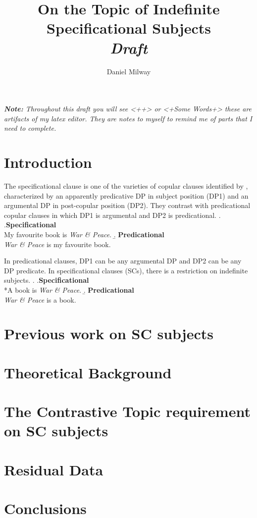 \documentclass[letterpaper]{article}
\title{On the Topic of Indefinite Specificational Subjects\\\textit{Draft}}
\author{Daniel Milway}
\begin{document}
\maketitle
\doublespacing
\textit{\textbf{Note:} Throughout this draft you will see <++> or <+Some Words+> these are artifacts of my latex editor.
They are notes to myself to remind me of parts that I need to complete.
}
\section{Introduction}
The specificational clause is one of the varieties of copular clauses identified by \textcite{higgins1973pseudo}, characterized by an apparently predicative DP in subject position (DP1) and an argumental DP in post-copular position (DP2).
They contrast with predicational copular clauses in which DP1 is argumental and DP2 is predicational.
\ex.
\a.\textbf{Specificational}\\
My favourite book is \textit{War \& Peace}.
\b. \textbf{Predicational}\\
\textit{War \& Peace} is my favourite book.

In predicational clauses, DP1 can be any argumental DP and DP2 can be any DP predicate.
In specificational clauses (SCs), there is a restriction on indefinite subjects.
\ex.
\a.\textbf{Specificational}\\
*A book is \textit{War \& Peace}.
\b. \textbf{Predicational}\\
\textit{War \& Peace} is a book.


\section{Previous work on SC subjects}

\section{Theoretical Background}

\section{The Contrastive Topic requirement on SC subjects}

\section{Residual Data}

\section{Conclusions}
\printbibliography
\end{document}
